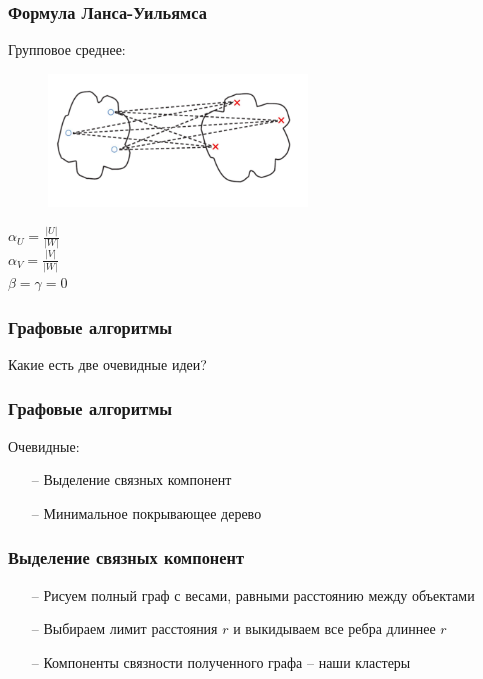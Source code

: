 \documentclass[12pt]{beamer}
\begin{document}
\begin{frame}\frametitle{Формула Ланса-Уильямса}
Групповое среднее:\\
\begin{figure}[htbp]
  \includegraphics[height=100pt, keepaspectratio = true]{images/lans3}  
\end{figure}
${\alpha_U = \frac{\vert U \vert}{\vert W \vert}}$\\${\alpha_V = \frac{\vert V \vert}{\vert W \vert}}$ \\${\beta = \gamma = 0}$
\end{frame}



\begin{frame}\frametitle{Графовые алгоритмы}
Какие есть две очевидные идеи?
\end{frame}

\begin{frame}\frametitle{Графовые алгоритмы}
Очевидные:\\
\begin{itemize}
\item[--] Выделение связных компонент
\item[--] Минимальное покрывающее дерево
\end{itemize}
\end{frame}

\begin{frame}\frametitle{Выделение связных компонент}
\begin{itemize}
\item[--] Рисуем полный граф с весами, равными расстоянию между объектами
\item[--] Выбираем лимит расстояния $r$ и выкидываем все ребра длиннее $r$
\item[--] Компоненты связности полученного графа -- наши кластеры
\end{itemize}
\end{frame}
\end{document}
